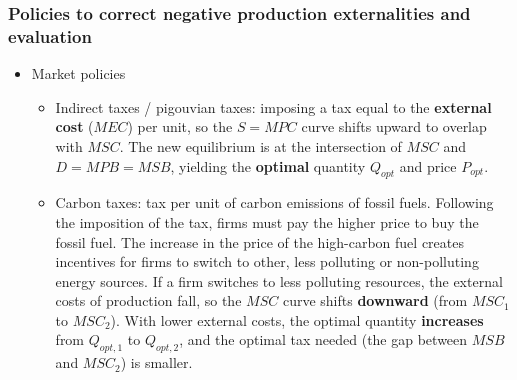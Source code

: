 \subsubsection*{Policies to correct negative production externalities and evaluation}
\begin{itemize}
  \item Market policies
  \begin{itemize}
    \item Indirect taxes / pigouvian taxes: imposing a tax equal to the \textbf{external cost} ($MEC$) per unit, so the $S = MPC$ curve shifts upward to overlap with $MSC$. The new equilibrium is at the intersection of $MSC$ and $D = MPB = MSB$, yielding the \textbf{optimal} quantity $Q_{opt}$ and price $P_{opt}$.

\begin{center}
\end{center}
    \item Carbon taxes: tax per unit of carbon emissions of fossil fuels. Following the imposition of the tax, firms must pay the higher price to buy the fossil fuel. The increase in the price of the high-carbon fuel creates incentives for firms to switch to other, less polluting or non-polluting energy sources. If a firm switches to less polluting resources, the external costs of production fall, so the $MSC$ curve shifts \textbf{downward} (from $MSC_1$ to $MSC_2$). With lower external costs, the optimal quantity \textbf{increases} from $Q_{opt,1}$ to $Q_{opt,2}$, and the optimal tax needed (the gap between $MSB$ and $MSC_2$) is smaller.


\end{itemize}
\end{itemize}
